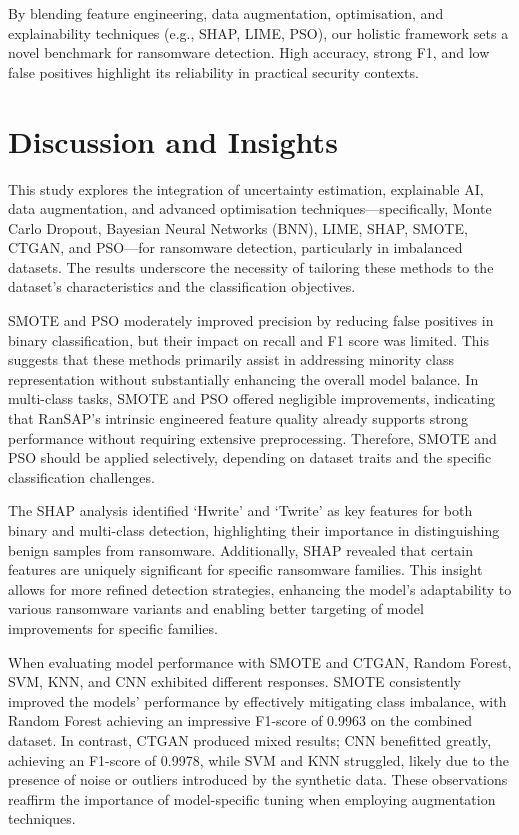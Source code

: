 By blending feature engineering, data augmentation, optimisation, and explainability techniques (e.g., SHAP, LIME, PSO),  our holistic framework sets a novel benchmark for ransomware detection. High accuracy, strong F1, and low false positives highlight its reliability in practical security contexts.


\section{Discussion and Insights}
\label{sec:Discussion}
This study explores the integration of uncertainty estimation, explainable AI, data augmentation, and advanced optimisation techniques—specifically, Monte Carlo Dropout, Bayesian Neural Networks (BNN), LIME, SHAP, SMOTE, CTGAN, and PSO—for ransomware detection, particularly in imbalanced datasets. The results underscore the necessity of tailoring these methods to the dataset’s characteristics and the classification objectives.

SMOTE and PSO moderately improved precision by reducing false positives in binary classification, but their impact on recall and F1 score was limited. This suggests that these methods primarily assist in addressing minority class representation without substantially enhancing the overall model balance. In multi-class tasks, SMOTE and PSO offered negligible improvements, indicating that RanSAP’s intrinsic engineered feature quality already supports strong performance without requiring extensive preprocessing. Therefore, SMOTE and PSO should be applied selectively, depending on dataset traits and the specific classification challenges.

The SHAP analysis identified ‘Hwrite’ and ‘Twrite’ as key features for both binary and multi-class detection, highlighting their importance in distinguishing benign samples from ransomware. Additionally, SHAP revealed that certain features are uniquely significant for specific ransomware families. This insight allows for more refined detection strategies, enhancing the model’s adaptability to various ransomware variants and enabling better targeting of model improvements for specific families.

When evaluating model performance with SMOTE and CTGAN, Random Forest, SVM, KNN, and CNN exhibited different responses. SMOTE consistently improved the models’ performance by effectively mitigating class imbalance, with Random Forest achieving an impressive F1-score of 0.9963 on the combined dataset. In contrast, CTGAN produced mixed results; CNN benefitted greatly, achieving an F1-score of 0.9978, while SVM and KNN struggled, likely due to the presence of noise or outliers introduced by the synthetic data. These observations reaffirm the importance of model-specific tuning when employing augmentation techniques.

